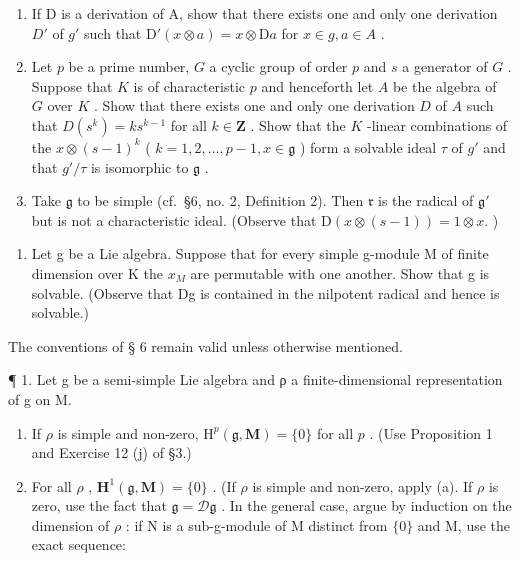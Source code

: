\begin{enumerate}
\def\labelenumi{(\alph{enumi})}
\item
  If D is a derivation of A, show that there exists one and only one derivation \(D'\) of \(g'\) such that \(\mathrm{D}'(x \otimes a) = x \otimes \mathrm{D}a\) for \(x \in g, a \in A\) .
\item
  Let \(p\) be a prime number, \(G\) a cyclic group of order \(p\) and \(s\) a generator of \(G\) . Suppose that \(K\) is of characteristic \(p\) and henceforth let \(A\) be the algebra of \(G\) over \(K\) . Show that there exists one and only one derivation \(D\) of \(A\) such that \(D(s^k) = ks^{k-1}\) for all \(k \in \mathbf{Z}\) . Show that the \(K\) -linear combinations of the \(x \otimes (s - 1)^k\) ( \(k = 1, 2, \ldots, p - 1, x \in \mathfrak{g}\) ) form a solvable ideal \(\tau\) of \(g'\) and that \(g'/\tau\) is isomorphic to \(\mathfrak{g}\) .
\item
  Take \(\mathfrak{g}\) to be simple (cf.~§6, no. 2, Definition 2). Then \(\mathfrak{r}\) is the radical of \(\mathfrak{g}'\) but is not a characteristic ideal. (Observe that \(\mathrm{D}(x\otimes (s - 1)) = 1\otimes x.\) )
\end{enumerate}

\begin{enumerate}
\def\labelenumi{\arabic{enumi}.}
\setcounter{enumi}{16}
\tightlist
\item
  Let g be a Lie algebra. Suppose that for every simple g-module M of finite dimension over K the \(x_{M}\) are permutable with one another. Show that g is solvable. (Observe that Dg is contained in the nilpotent radical and hence is solvable.)
\end{enumerate}


The conventions of § 6 remain valid unless otherwise mentioned.

¶ 1. Let g be a semi-simple Lie algebra and ρ a finite-dimensional representation of g on M.

\begin{enumerate}
\def\labelenumi{(\alph{enumi})}
\item
  If \(\rho\) is simple and non-zero, \(\mathrm{H}^p (\mathfrak{g},\mathbf{M}) = \{0\}\) for all \(p\) . (Use Proposition 1 and Exercise 12 (j) of §3.)
\item
  For all \(\rho\) , \(\mathbf{H}^1(\mathfrak{g}, \mathbf{M}) = \{0\}\) . (If \(\rho\) is simple and non-zero, apply (a). If \(\rho\) is zero, use the fact that \(\mathfrak{g} = \mathcal{D}\mathfrak{g}\) . In the general case, argue by induction on the dimension of \(\rho\) : if N is a sub-g-module of M distinct from \(\{0\}\) and M, use the exact sequence:
\end{enumerate}

